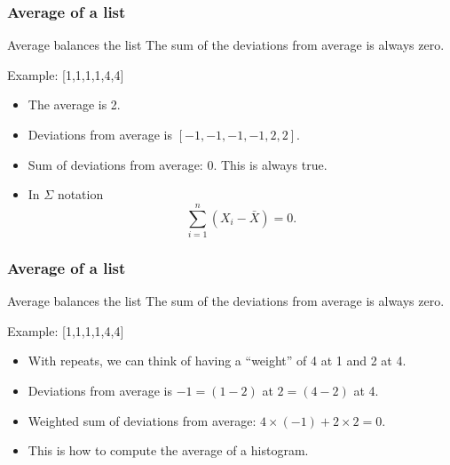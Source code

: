 \documentclass[handout]{beamer}
\begin{document}

   \begin{frame} \frametitle{Average of a list}

   \begin{block}
   {Average balances the list}
   The sum of the deviations from average is always zero.

   \end{block}

   \begin{block}
   {Example: [1,1,1,1,4,4]}


   \begin{itemize}
   \item The average is 2.

   \item Deviations from average is $[-1,-1,-1,-1,2,2]$.

   \item Sum of deviations from average: 0. This is always true.

   \item In $\Sigma$ notation
   $$
   \sum_{i=1}^n (X_i - \bar{X}) = 0.
   $$

   \end{itemize}
   \end{block}
   \end{frame}


   \begin{frame} \frametitle{Average of a list}

   \begin{block}
   {Average balances the list}
   The sum of the deviations from average is always zero.

   \end{block}

   \begin{block}
   {Example: [1,1,1,1,4,4]}


   \begin{itemize}
   \item With repeats, we can think of having a ``weight'' of 4 at 1 and 2 at 4.

   \item Deviations from average is $-1=(1-2)$ at $2=(4-2)$ at 4.

   \item Weighted sum of deviations from average: $4 \times (-1) + 2 \times 2 = 0$.

   \item This is how to compute the average of a histogram.

   \end{itemize}
   \end{block}
   \end{frame}
\end{document}
